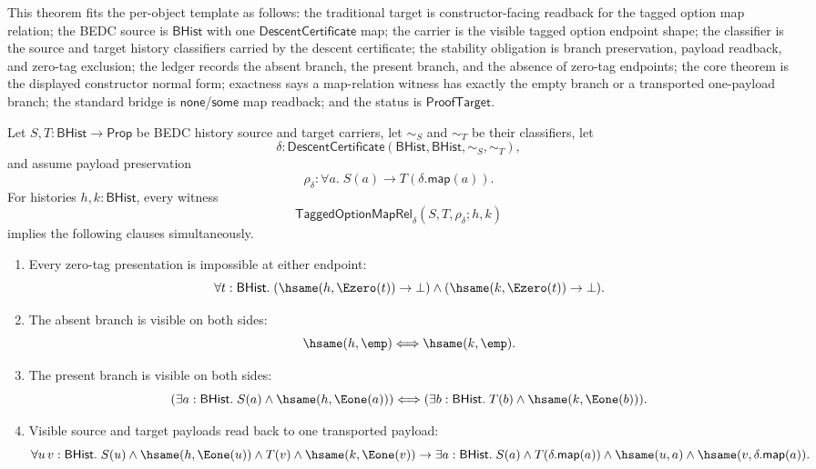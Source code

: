 \begin{theorem}
\label{thm:tagged-option-maprel-constructor-normal-form}
This theorem fits the per-object template as follows: the traditional target is
constructor-facing readback for the tagged option map relation; the BEDC source
is $\mathsf{BHist}$ with one $\mathsf{DescentCertificate}$ map; the carrier is
the visible tagged option endpoint shape; the classifier is the source and
target history classifiers carried by the descent certificate; the stability
obligation is branch preservation, payload readback, and zero-tag exclusion; the
ledger records the absent branch, the present branch, and the absence of
zero-tag endpoints; the core theorem is the displayed constructor normal form;
exactness says a map-relation witness has exactly the empty branch or a
transported one-payload branch; the standard bridge is $\mathsf{none}$/$\mathsf{some}$
map readback; and the status is $\mathsf{ProofTarget}$.

Let $S,T:\mathsf{BHist}\to\mathsf{Prop}$ be BEDC history source and target
carriers, let $\sim_S$ and $\sim_T$ be their classifiers, let
$$
\delta:\mathsf{DescentCertificate}(\mathsf{BHist},\mathsf{BHist},\sim_S,\sim_T),
$$
and assume payload preservation
$$
\rho_{\delta}:\forall a.\;S(a)\to T(\delta.\mathsf{map}(a)).
$$
For histories $h,k:\mathsf{BHist}$, every witness
$$
\mathsf{TaggedOptionMapRel}_{\delta}(S,T,\rho_{\delta};h,k)
$$
implies the following clauses simultaneously.
\begin{enumerate}
  \item Every zero-tag presentation is impossible at either endpoint:
  $$
  \forall t:\mathsf{BHist}.\;
  (\hsame(h,\Ezero(t))\to\bot)\land
  (\hsame(k,\Ezero(t))\to\bot).
  $$

  \item The absent branch is visible on both sides:
  $$
  \hsame(h,\emp)\Longleftrightarrow\hsame(k,\emp).
  $$

  \item The present branch is visible on both sides:
  $$
  (\exists a:\mathsf{BHist}.\;S(a)\land\hsame(h,\Eone(a)))
  \Longleftrightarrow
  (\exists b:\mathsf{BHist}.\;T(b)\land\hsame(k,\Eone(b))).
  $$

  \item Visible source and target payloads read back to one transported
  payload:
  $$
  \forall u\,v:\mathsf{BHist}.\;
  S(u)\land\hsame(h,\Eone(u))\land
  T(v)\land\hsame(k,\Eone(v))
  \to
  \exists a:\mathsf{BHist}.\;
  S(a)\land T(\delta.\mathsf{map}(a))\land
  \hsame(u,a)\land\hsame(v,\delta.\mathsf{map}(a)).
  $$
\end{enumerate}
\end{theorem}
